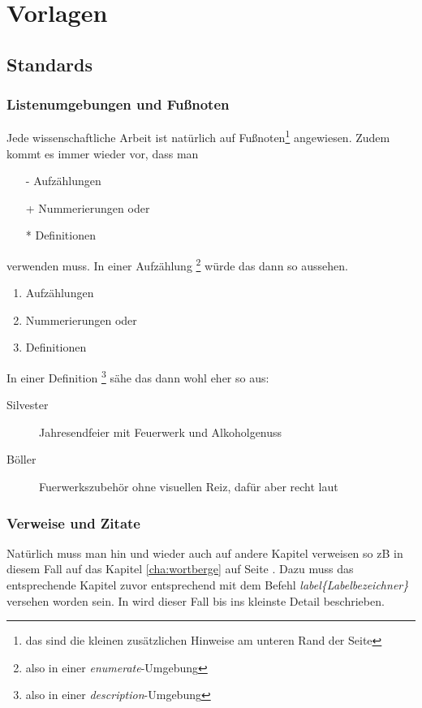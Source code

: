 \chapter{Vorlagen}
\label{cha:Vorlagen}

\section{Standards}
\subsection{Listenumgebungen und Fußnoten}
Jede wissenschaftliche Arbeit ist natürlich auf Fußnoten\footnote{das sind die kleinen zusätzlichen Hinweise am unteren Rand der Seite} angewiesen. Zudem kommt es immer wieder vor, dass man 
\begin{itemize}
\item[-] Aufzählungen
\item[+] Nummerierungen oder
\item[*] Definitionen 
\end{itemize}
verwenden muss. In einer Aufzählung \footnote{also in einer \textit{enumerate}-Umgebung} würde das dann so aussehen.
\begin{enumerate}
\item Aufzählungen
\item Nummerierungen oder
\item Definitionen 
\end{enumerate}

In einer Definition \footnote{also in einer \textit{description}-Umgebung} sähe das dann wohl eher so aus:

\begin{description}
\item[Silvester]Jahresendfeier mit Feuerwerk und Alkoholgenuss
\item[Böller] Fuerwerkszubehör ohne visuellen Reiz, dafür aber recht laut
\end{description}
\subsection{Verweise und Zitate}
Natürlich muss man hin und wieder auch auf andere Kapitel verweisen so zB in diesem Fall auf das Kapitel \ref{cha:wortberge} auf Seite \pageref{cha:wortberge}. Dazu muss das entsprechende Kapitel zuvor entsprechend mit dem Befehl \textit{\bs label\{Labelbezeichner\}} versehen worden sein. In \cite{foobar2003} wird dieser Fall bis ins kleinste Detail beschrieben.

